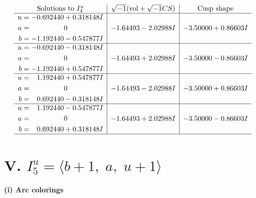 \documentclass[1p]{elsarticle_modified}
\theoremstyle{definition}
\newcommand{\I}{\sqrt{-1}}
\begin{document}
$$\begin{array}{c|c|c}  
\text{Solutions to }I^u_{4}& \I (\text{vol} + \sqrt{-1}CS) & \text{Cusp shape}\\
 \hline 
\begin{aligned}
u &= -0.692440 + 0.318148 I \\
a &= \phantom{-0.000000 } 0 \\
b &= -1.192440 - 0.547877 I\end{aligned}
 & -1.64493 - 2.02988 I & -3.50000 + 0.86603 I \\ \hline\begin{aligned}
u &= -0.692440 - 0.318148 I \\
a &= \phantom{-0.000000 } 0 \\
b &= -1.192440 + 0.547877 I\end{aligned}
 & -1.64493 + 2.02988 I & -3.50000 - 0.86603 I \\ \hline\begin{aligned}
u &= \phantom{-}1.192440 + 0.547877 I \\
a &= \phantom{-0.000000 } 0 \\
b &= \phantom{-}0.692440 - 0.318148 I\end{aligned}
 & -1.64493 - 2.02988 I & -3.50000 + 0.86603 I \\ \hline\begin{aligned}
u &= \phantom{-}1.192440 - 0.547877 I \\
a &= \phantom{-0.000000 } 0 \\
b &= \phantom{-}0.692440 + 0.318148 I\end{aligned}
 & -1.64493 + 2.02988 I & -3.50000 - 0.86603 I\\
 \hline 
 \end{array}$$\newpage\newpage\renewcommand{\arraystretch}{1}
\centering \section*{V. $I^u_{5}= \langle b+1,\;a,\;u+1 \rangle$}
\flushleft \textbf{(i) Arc colorings}\\
\end{document}
